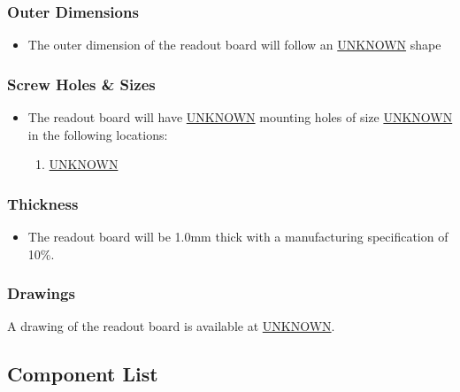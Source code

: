 \documentclass[11pt]{article}
\begin{document}
\subsubsection{Outer Dimensions}
\label{sec:org099032e}
\begin{itemize}
\item The outer dimension of the readout board will follow an \uline{UNKNOWN} shape
\end{itemize}
\subsubsection{Screw Holes \& Sizes}
\label{sec:orga1bd739}
\begin{itemize}
\item The readout board will have \uline{UNKNOWN} mounting holes of size \uline{UNKNOWN} in the following locations:
\begin{enumerate}
\item \uline{UNKNOWN}
\end{enumerate}
\end{itemize}
\subsubsection{Thickness}
\label{sec:orgb1ef31e}
\begin{itemize}
\item The readout board will be 1.0mm thick with a manufacturing specification of \textpm{} 10\%.
\end{itemize}
\subsubsection{Drawings}
\label{sec:org6c04241}
A drawing of the readout board is available at \uline{UNKNOWN}.
\subsection{Component List}
\label{sec:org4a83598}
\end{document}

